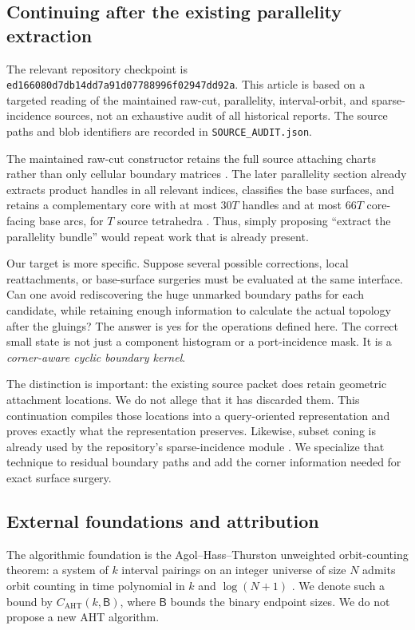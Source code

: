 \documentclass[11pt]{article}
\theoremstyle{definition}
\theoremstyle{remark}\newtheorem{remark}[theorem]{Remark}
\newcommand{\code}[1]{\texttt{#1}}
\newcommand{\bits}{\mathsf B}
\newcommand{\AHT}{C_{\mathrm{AHT}}}
\newcommand{\snap}{\texttt{ed166080d7db14dd7a91d07788996f02947dd92a}}
\begin{document}
\subsection{Continuing after the existing parallelity extraction}
The relevant repository checkpoint is \snap. This article is based on a targeted reading of the maintained raw-cut, parallelity, interval-orbit, and sparse-incidence sources, not an exhaustive audit of all historical reports. The source paths and blob identifiers are recorded in \code{SOURCE\_AUDIT.json}.

The maintained raw-cut constructor retains the full source attaching charts rather than only cellular boundary matrices \cite{rawcut}. The later parallelity section already extracts product handles in all relevant indices, classifies the base surfaces, and retains a complementary core with at most $30T$ handles and at most $66T$ core-facing base arcs, for $T$ source tetrahedra \cite{parallelity}. Thus, simply proposing ``extract the parallelity bundle'' would repeat work that is already present.

Our target is more specific. Suppose several possible corrections, local reattachments, or base-surface surgeries must be evaluated at the same interface. Can one avoid rediscovering the huge unmarked boundary paths for each candidate, while retaining enough information to calculate the actual topology after the gluings? The answer is yes for the operations defined here. The correct small state is not just a component histogram or a port-incidence mask. It is a \emph{corner-aware cyclic boundary kernel}.

The distinction is important: the existing source packet does retain geometric attachment locations. We do not allege that it has discarded them. This continuation compiles those locations into a query-oriented representation and proves exactly what the representation preserves. Likewise, subset coning is already used by the repository's sparse-incidence module \cite{sparse}. We specialize that technique to residual boundary paths and add the corner information needed for exact surface surgery.

\subsection{External foundations and attribution}
The algorithmic foundation is the Agol--Hass--Thurston unweighted orbit-counting theorem: a system of $k$ interval pairings on an integer universe of size $N$ admits orbit counting in time polynomial in $k$ and $\log(N+1)$ \cite[Theorem~12]{aht}. We denote such a bound by $\AHT(k,\bits)$, where $\bits$ bounds the binary endpoint sizes. We do not propose a new AHT algorithm.
\end{document}
